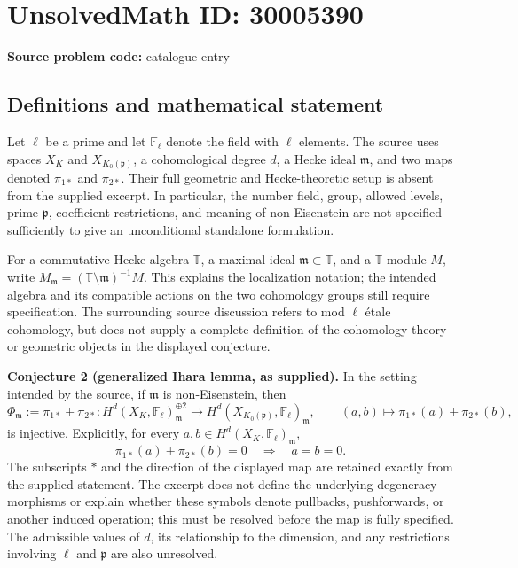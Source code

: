 \documentclass[11pt]{article}
\newcommand{\F}{\mathbb{F}}
\begin{document}
\section*{UnsolvedMath ID: 30005390}
\textbf{Source problem code:} catalogue entry
\subsection{Definitions and mathematical statement}
Let \(\ell\) be a prime and let \(\F_\ell\) denote the field with \(\ell\) elements. The source uses spaces \(X_K\) and \(X_{K_0(\mathfrak p)}\), a cohomological degree \(d\), a Hecke ideal \(\mathfrak m\), and two maps denoted \(\pi_{1*}\) and \(\pi_{2*}\). Their full geometric and Hecke-theoretic setup is absent from the supplied excerpt. In particular, the number field, group, allowed levels, prime \(\mathfrak p\), coefficient restrictions, and meaning of non-Eisenstein are not specified sufficiently to give an unconditional standalone formulation.

For a commutative Hecke algebra \(\mathbb T\), a maximal ideal \(\mathfrak m\subset\mathbb T\), and a \(\mathbb T\)-module \(M\), write \(M_{\mathfrak m}=(\mathbb T\setminus\mathfrak m)^{-1}M\). This explains the localization notation; the intended algebra and its compatible actions on the two cohomology groups still require specification. The surrounding source discussion refers to mod \(\ell\) \'etale cohomology, but does not supply a complete definition of the cohomology theory or geometric objects in the displayed conjecture.

\textbf{Conjecture 2 (generalized Ihara lemma, as supplied).} In the setting intended by the source, if \(\mathfrak m\) is non-Eisenstein, then
\[
\Phi_{\mathfrak m}:=\pi_{1*}+\pi_{2*}:
H^d(X_K,\F_\ell)_{\mathfrak m}^{\oplus 2}
\longrightarrow
H^d(X_{K_0(\mathfrak p)},\F_\ell)_{\mathfrak m},
\qquad
(a,b)\longmapsto\pi_{1*}(a)+\pi_{2*}(b),
\]
is injective. Explicitly, for every \(a,b\in H^d(X_K,\F_\ell)_{\mathfrak m}\),
\[
\pi_{1*}(a)+\pi_{2*}(b)=0
\quad\Longrightarrow\quad a=b=0.
\]
The subscripts \(*\) and the direction of the displayed map are retained exactly from the supplied statement. The excerpt does not define the underlying degeneracy morphisms or explain whether these symbols denote pullbacks, pushforwards, or another induced operation; this must be resolved before the map is fully specified. The admissible values of \(d\), its relationship to the dimension, and any restrictions involving \(\ell\) and \(\mathfrak p\) are also unresolved.
\end{document}
